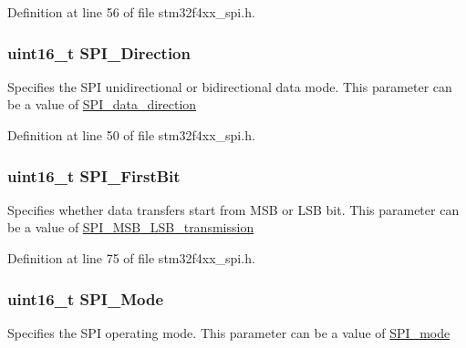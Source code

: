 Definition at line 56 of file stm32f4xx\-\_\-spi.\-h.

\hypertarget{struct_s_p_i___init_type_def_a485dbba7798a7ff3d00dfabba19584b8}{
\subsubsection[{S\-P\-I\-\_\-\-Direction}]{\setlength{\rightskip}{0pt plus 5cm}uint16\-\_\-t S\-P\-I\-\_\-\-Direction}}\label{struct_s_p_i___init_type_def_a485dbba7798a7ff3d00dfabba19584b8}
Specifies the S\-P\-I unidirectional or bidirectional data mode. This parameter can be a value of \hyperlink{group___s_p_i__data__direction}{S\-P\-I\-\_\-data\-\_\-direction} 

Definition at line 50 of file stm32f4xx\-\_\-spi.\-h.

\hypertarget{struct_s_p_i___init_type_def_a5e5761d0b588ff75ad15adb2adf9e7e7}{
\subsubsection[{S\-P\-I\-\_\-\-First\-Bit}]{\setlength{\rightskip}{0pt plus 5cm}uint16\-\_\-t S\-P\-I\-\_\-\-First\-Bit}}\label{struct_s_p_i___init_type_def_a5e5761d0b588ff75ad15adb2adf9e7e7}
Specifies whether data transfers start from M\-S\-B or L\-S\-B bit. This parameter can be a value of \hyperlink{group___s_p_i___m_s_b___l_s_b__transmission}{S\-P\-I\-\_\-\-M\-S\-B\-\_\-\-L\-S\-B\-\_\-transmission} 

Definition at line 75 of file stm32f4xx\-\_\-spi.\-h.

\hypertarget{struct_s_p_i___init_type_def_aeddd33e224d56672843782c105ed82e4}{
\subsubsection[{S\-P\-I\-\_\-\-Mode}]{\setlength{\rightskip}{0pt plus 5cm}uint16\-\_\-t S\-P\-I\-\_\-\-Mode}}\label{struct_s_p_i___init_type_def_aeddd33e224d56672843782c105ed82e4}
Specifies the S\-P\-I operating mode. This parameter can be a value of \hyperlink{group___s_p_i__mode}{S\-P\-I\-\_\-mode} 

